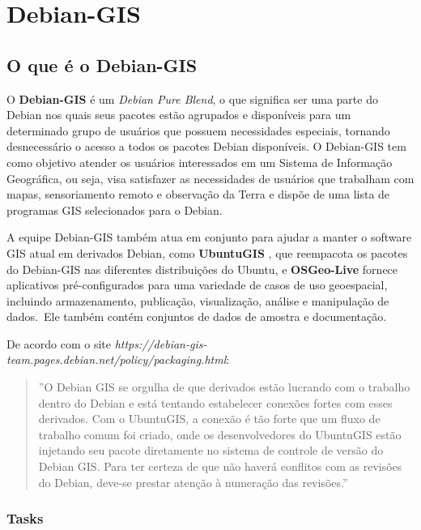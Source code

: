 \chapter{Debian-GIS}
\section{O que é o Debian-GIS}

O \textbf{Debian-GIS} é um \textit{Debian Pure Blend}, o que significa ser uma parte do Debian nos quais seus pacotes estão agrupados e disponíveis para um determinado grupo de usuários que possuem necessidades especiais, tornando desnecessário o acesso a todos os pacotes Debian disponíveis. O Debian-GIS tem como objetivo atender os usuários interessados em um Sistema de Informação Geográfica, ou seja, visa satisfazer as necessidades de usuários que trabalham com mapas, sensoriamento remoto e observação da Terra e dispõe de uma lista de programas GIS selecionados para o Debian.

A equipe Debian-GIS também atua em conjunto para ajudar a manter o software GIS atual em derivados Debian, como \textbf{UbuntuGIS} , que reempacota os pacotes do Debian-GIS nas diferentes distribuições do Ubuntu, e \textbf{OSGeo-Live} fornece aplicativos pré-configurados para uma variedade de casos de uso geoespacial, incluindo armazenamento, publicação, visualização, análise e manipulação de dados. Ele também contém conjuntos de dados de amostra e documentação.

De acordo com o site \textit{https://debian-gis-team.pages.debian.net/policy/packaging.html}:

\begin{quote}
	''O Debian GIS se orgulha de que derivados estão lucrando com o trabalho dentro do Debian e está tentando estabelecer conexões fortes com esses derivados. Com o UbuntuGIS, a conexão é tão forte que um fluxo de trabalho comum foi criado, onde os desenvolvedores do UbuntuGIS estão injetando seu pacote diretamente no sistema de controle de versão do Debian GIS. Para ter certeza de que não haverá conflitos com as revisões do Debian, deve-se prestar atenção à numeração das revisões.''
\end{quote}

\subsection{Tasks}


